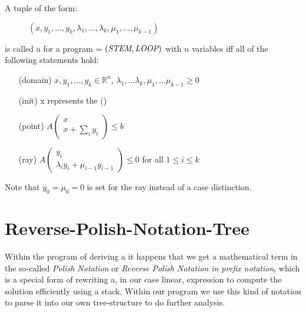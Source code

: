 \begin{definition}
	\label{def:gna}
	A tuple of the form:
	\begin{figure}[H]
		\centering
		$(x, y_1, \dots, y_k, \lambda_1, \dots, \lambda_k, \mu_1, \dots, \mu_{k-1})$
	\end{figure}  
	\vspace{-1em}
	is called a \gna for a program = $(\textit{STEM}, \textit{LOOP})$ with $n$ variables iff all of the following statements hold:
	\begin{itemize}
		\setlength{\itemindent}{1in}
		\item[(domain)] $x, y_1, \dots, y_k \in \mathbb{R}^n$, $\lambda_1, \dots \lambda_k, \mu_1, \dots \mu_{k-1} \ge 0$
		\item[(init)] x represents the \startterm (\stem)
		\item[(point)] $A\begin{pmatrix} x \\ x + \sum_i y_i \end{pmatrix} \le b$
		\item[(ray)] $A\begin{pmatrix} y_i \\ \lambda_i y_i + \mu_{i-1} y_{i-1} \end{pmatrix} \le 0$ for all $1 \le i \le k$
	\end{itemize}
	Note that $y_0 = \mu_0 = 0$ is set for the ray instead of a case distinction. \cite{leike2014geometric}
\end{definition}


\section{Reverse-Polish-Notation-Tree}
\label{sec:rpntree}
Within the program of deriving a \gna it happens that we get a mathematical term in the so-called \textit{Polish Notation} or \textit{Reverse Polish Notation in prefix notation}, which is a special form of rewriting a, in our case linear, expression to compute the solution efficiently using a stack. Within our program we use this kind of notation to parse it into our own tree-structure to do further analysis. \cite{wikirpn}

